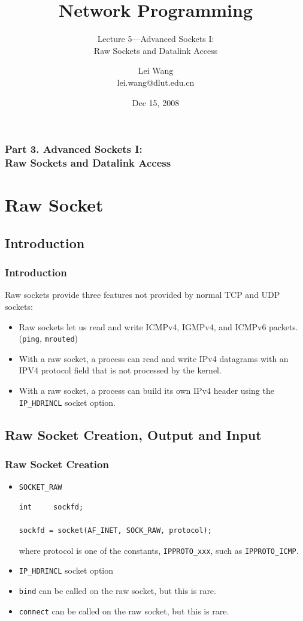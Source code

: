 \documentclass[notes,serif]{beamer}
\title{Network Programming}
\subtitle{Lecture 5---Advanced Sockets I: \\ Raw Sockets and Datalink Access}
\author{Lei Wang\\ lei.wang@dlut.edu.cn}
\institute{Dalian University of Technology}
\date{Dec 15, 2008}
\begin{document}
\begin{frame}
  \titlepage
\end{frame}

\begin{frame}
  \frametitle{Part 3. Advanced Sockets I: \\ Raw Sockets and Datalink Access}
  \tableofcontents
\end{frame}

\section{Raw Socket}
\subsection{Introduction}
\begin{frame}
\frametitle{Introduction}

Raw sockets provide three features not provided by normal TCP and UDP sockets:
\begin{itemize}
  \item Raw sockets let us read and write ICMPv4, IGMPv4, and ICMPv6 packets. (\texttt{ping}, \texttt{mrouted})
  \item With a raw socket, a process can read and write IPv4 datagrams with an IPV4 protocol field that is not processed by the kernel.
  \item With a raw socket, a process can build its own IPv4 header using the \texttt{IP\_HDRINCL} socket option.
\end{itemize}
\end{frame}

\subsection{Raw Socket Creation, Output and Input}

\begin{frame}[containsverbatim]
\frametitle{Raw Socket Creation}
\begin{itemize}
  \item \texttt{SOCKET\_RAW}
{\scriptsize
  \begin{verbatim}
int     sockfd;

sockfd = socket(AF_INET, SOCK_RAW, protocol);
  \end{verbatim}
  \begin{flushleft}
  where protocol is one of the constants, \texttt{IPPROTO\_xxx}, such as \texttt{IPPROTO\_ICMP}.
  \end{flushleft}
}
  \item \texttt{IP\_HDRINCL} socket option
  \item \texttt{bind} can be called on the raw socket, but this is rare.
  \item \texttt{connect} can be called on the raw socket, but this is rare.
\end{itemize}
\end{frame}
\end{document}
